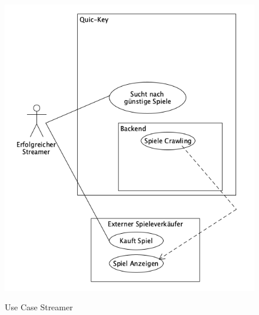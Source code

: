 \begin{figure}[hbt]
    \begin{minipage}[t]{.7\textwidth} %
        \caption{Use Case Streamer} %
        \includegraphics[width=1\textwidth]{img/use_case_streamer.png}\\ %
    \end{minipage}
\end{figure}
    
